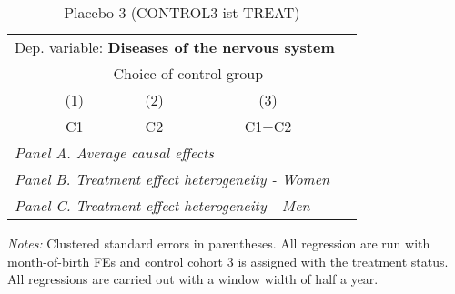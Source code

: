  \begin{table}[H] \centering \begin{threeparttable} \caption{Placebo 3 (CONTROL3 ist TREAT) } {\def\sym#1{\ifmmode^{#1}\else\(^{#1}\)\fi} \begin{tabular}{l*{4}{c}} \toprule \multicolumn{4}{l}{Dep. variable: \textbf{Diseases of the nervous system}} \\ & \multicolumn{3}{c}{Choice of control group} \\ \cmidrule(lr){2-4}
            &\multicolumn{1}{c}{(1)}&\multicolumn{1}{c}{(2)}&\multicolumn{1}{c}{(3)}\\
            &\multicolumn{1}{c}{C1}&\multicolumn{1}{c}{C2}&\multicolumn{1}{c}{C1+C2}\\
\midrule
 \multicolumn{4}{l}{\emph{Panel A. Average causal effects}} \\      \midrule\multicolumn{4}{l}{\emph{Panel B. Treatment effect heterogeneity - Women}} \\      \midrule\multicolumn{4}{l}{\emph{Panel C. Treatment effect heterogeneity - Men}} \\      
\bottomrule \end{tabular} } \begin{tablenotes} \item \scriptsize \emph{Notes:} Clustered standard errors in parentheses. All regression are run with month-of-birth FEs and control cohort 3 is assigned with the treatment status. All regressions are carried out with a window width of half a year. \end{tablenotes} \end{threeparttable} \end{table} 
